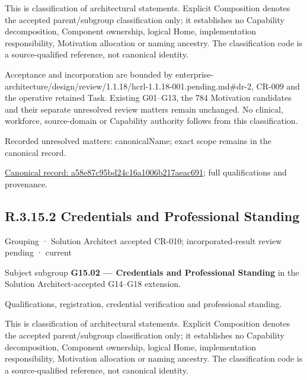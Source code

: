 This is classification of architectural statements. Explicit Composition denotes the accepted parent/subgroup classification only; it establishes no Capability decomposition, Component ownership, logical Home, implementation responsibility, Motivation allocation or naming ancestry. The classification code is a source-qualified reference, not canonical identity.



Acceptance and incorporation are bounded by enterprise-architecture/design/review/1.1.18/hcrl-1.1.18-001.pending.md\#dr-2, CR-009 and the operative retained Task. Existing G01–G13, the 784 Motivation candidates and their separate unresolved review matters remain unchanged. No clinical, workforce, source-domain or Capability authority follows from this classification.


{\small Recorded unresolved matters: canonicalName; exact scope remains in the canonical record.}\par
{\footnotesize \href{../../../../continuum/grouping/a58e87c95bd24c16a1006b217aeac691.md}{Canonical record: a58e87c95bd24c16a1006b217aeac691}; full qualifications and provenance.}\par
\subsection*{R.3.15.2 Credentials and Professional Standing}
\label{navigation:R.3.15.2}

\label{element:2ad6333e5858456dba8aefeec71773a5}
{\small Grouping · Solution Architect accepted CR-010; incorporated-result review pending · current}\par

Subject subgroup \textbf{G15.02 — Credentials and Professional Standing} in the Solution Architect-accepted G14–G18 extension.



Qualifications, registration, credential verification and professional standing.



This is classification of architectural statements. Explicit Composition denotes the accepted parent/subgroup classification only; it establishes no Capability decomposition, Component ownership, logical Home, implementation responsibility, Motivation allocation or naming ancestry. The classification code is a source-qualified reference, not canonical identity.



